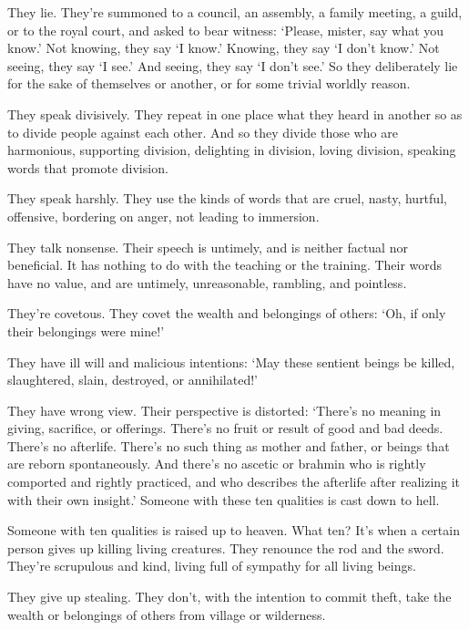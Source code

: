 \documentclass[12pt,openany]{book}%
\begin{document}
They lie. They’re summoned to a council, an assembly, a family meeting, a guild, or to the royal court, and asked to bear witness: ‘Please, mister, say what you know.’ Not knowing, they say ‘I know.’ Knowing, they say ‘I don’t know.’ Not seeing, they say ‘I see.’ And seeing, they say ‘I don’t see.’ So they deliberately lie for the sake of themselves or another, or for some trivial worldly reason. 

They speak divisively. They repeat in one place what they heard in another so as to divide people against each other. And so they divide those who are harmonious, supporting division, delighting in division, loving division, speaking words that promote division. 

They speak harshly. They use the kinds of words that are cruel, nasty, hurtful, offensive, bordering on anger, not leading to immersion. 

They talk nonsense. Their speech is untimely, and is neither factual nor beneficial. It has nothing to do with the teaching or the training. Their words have no value, and are untimely, unreasonable, rambling, and pointless. 

They’re covetous. They covet the wealth and belongings of others: ‘Oh, if only their belongings were mine!’ 

They have ill will and malicious intentions: ‘May these sentient beings be killed, slaughtered, slain, destroyed, or annihilated!’ 

They have wrong view. Their perspective is distorted: ‘There’s no meaning in giving, sacrifice, or offerings. There’s no fruit or result of good and bad deeds. There’s no afterlife. There’s no such thing as mother and father, or beings that are reborn spontaneously. And there’s no ascetic or brahmin who is rightly comported and rightly practiced, and who describes the afterlife after realizing it with their own insight.’ Someone with these ten qualities is cast down to hell. 

Someone with ten qualities is raised up to heaven. What ten? It’s when a certain person gives up killing living creatures. They renounce the rod and the sword. They’re scrupulous and kind, living full of sympathy for all living beings. 

They give up stealing. They don’t, with the intention to commit theft, take the wealth or belongings of others from village or wilderness. 
\end{document}
